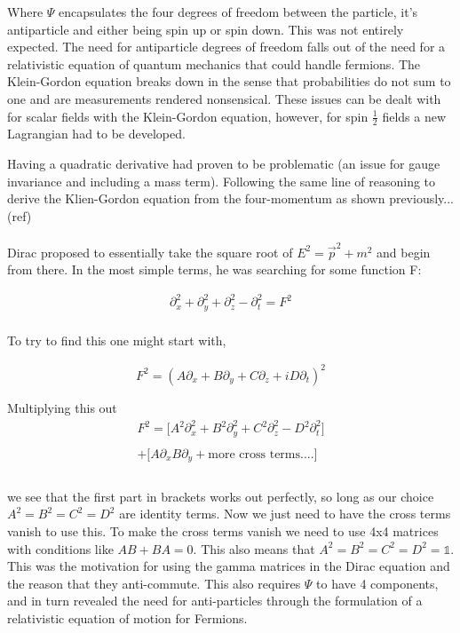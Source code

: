 \documentclass[aps,secnumarabic,nobalancelastpage,amsmath,amssymb,
nofootinbib]{revtex4}
\begin{document}
\indent Where $\Psi$ encapsulates the four degrees of freedom between the particle, it's antiparticle and either being spin up or spin down. This was not entirely expected. The need for antiparticle degrees of freedom falls out of the need for a relativistic equation of quantum mechanics that could handle fermions. The Klein-Gordon equation breaks down in the sense that probabilities do not sum to one and are measurements rendered nonsensical. These issues can be dealt with for scalar fields with the Klein-Gordon equation, however, for spin $\frac{1}{2}$ fields a new Lagrangian had to be developed.

Having a quadratic derivative had proven to be problematic (an issue for gauge invariance and including a mass term). Following the same line of reasoning to derive the Klien-Gordon equation from the four-momentum as shown previously... (ref) \\\\
 Dirac proposed to essentially take the square root of $E^2=\vec{p}^2 +m^2$ and begin from there. In the most simple terms, he was searching for some function F:

\begin{equation}
\begin{split}
\partial_x^2+\partial_y^2+\partial_z^2-\partial_t^2=F^2\\
\, \label{eq:21}
\end{split}
\end{equation}

\noindent To try to find this one might start with,

\begin{equation}
\begin{split}
F^2=(A \partial_x+B \partial_y+C \partial_z+i D \partial_t)^2\\
\\
\end{split}
\end{equation}
Multiplying this out
\begin{equation}
\begin{split}
F^2=\bigg[A^2 \partial_x^2+B^2 \partial_y^2+C^2 \partial_z^2- D^2 \partial_t^2 \bigg] \\\\+\bigg[ A \partial_x B \partial_y + \text{more cross terms....} \bigg]\\
\, \label{eq:21}
\end{split}
\end{equation}
\\
we see that the first part in brackets works out perfectly, so long as our choice $A^2=B^2=C^2=D^2$ are identity terms. Now we just need to have the cross terms vanish to use this. To make the cross terms vanish we need to use 4x4 matrices with conditions like $AB+BA=0$. This also means that $A^2=B^2=C^2=D^2=\mathbb{1}$. This was the motivation for using the gamma matrices in the Dirac equation and the reason that they anti-commute. This also requires $\Psi$ to have 4 components, and in turn revealed the need for anti-particles through the formulation of a relativistic equation of motion for Fermions.\\
\end{document}
